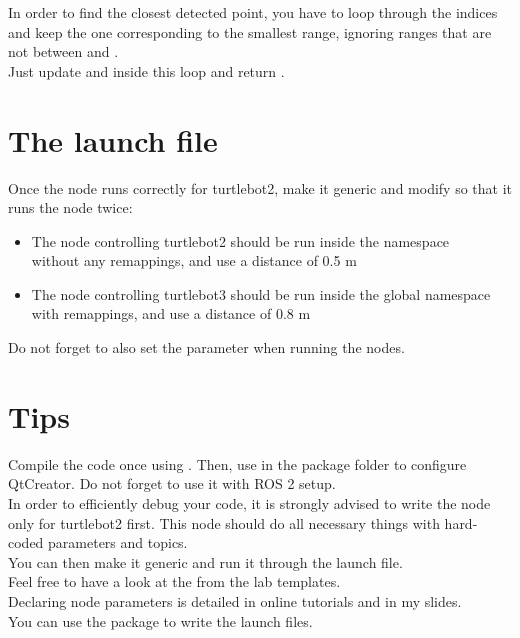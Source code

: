 \documentclass{ecnreport}
\begin{document}
In order to find the closest detected point, you have to loop through the indices and keep the one corresponding to the smallest range, ignoring ranges that are not between  and . \\
Just update  and  inside this loop and return .

\section{The launch file}

Once the node runs correctly for turtlebot2, make it generic and modify  so that it runs the node twice:
\begin{itemize}
 \item The node controlling turtlebot2 should be run inside the  namespace\\without any remappings, and use a distance of 0.5 m
 \item The node controlling turtlebot3 should be run inside the global namespace with remappings, and use a distance of 0.8 m
\end{itemize}
Do not forget to also set the  parameter when running the nodes.


\newpage

\section{Tips}

Compile the code once using . Then, use  in the package folder to configure QtCreator. Do not forget to use it with ROS 2 setup.\\

In order to efficiently debug your code, it is strongly advised to write the node only for turtlebot2 first. This node should do all necessary things with hard-coded parameters and topics.\\
You can then make it generic and run it through the launch file.\\

Feel free to have a look at the  from the lab templates.\\

Declaring node parameters is detailed in online tutorials and in my slides.\\

You can use the  package to write the launch files.
\end{document}
